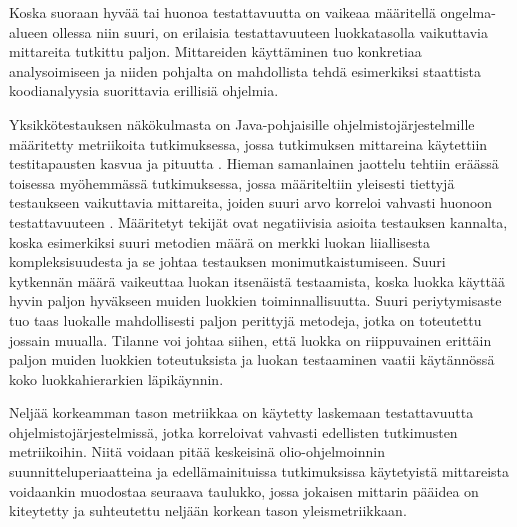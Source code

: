 \documentclass[finnish]{tktltiki2}
\numberwithin{table}{section}
\theoremstyle{definition}
\theoremstyle{remark}
\begin{document}
Koska suoraan hyvää tai huonoa testattavuutta on vaikeaa määritellä ongelma-alueen ollessa niin suuri, on erilaisia testattavuuteen luokkatasolla vaikuttavia mittareita tutkittu paljon. Mittareiden käyttäminen tuo konkretiaa analysoimiseen ja niiden pohjalta on mahdollista tehdä esimerkiksi staattista koodianalyysia suorittavia erillisiä ohjelmia. 

Yksikkötestauksen näkökulmasta on Java-pohjaisille ohjelmistojärjestelmille määritetty metriikoita tutkimuksessa, jossa tutkimuksen mittareina käytettiin testitapausten kasvua ja pituutta \citep{Bruntink:2004}. Hieman samanlainen jaottelu tehtiin eräässä toisessa myöhemmässä tutkimuksessa, jossa määriteltiin yleisesti tiettyjä testaukseen vaikuttavia mittareita, joiden suuri arvo korreloi vahvasti huonoon testattavuuteen \citep{Dubey:2011:AMM:2020976.2020983}. Määritetyt tekijät ovat negatiivisia asioita testauksen kannalta, koska esimerkiksi suuri metodien määrä on merkki luokan liiallisesta kompleksisuudesta ja se johtaa testauksen monimutkaistumiseen. Suuri kytkennän määrä vaikeuttaa luokan itsenäistä testaamista, koska luokka käyttää hyvin paljon hyväkseen muiden luokkien toiminnallisuutta. Suuri periytymisaste tuo taas luokalle mahdollisesti paljon perittyjä metodeja, jotka on toteutettu jossain muualla. Tilanne voi johtaa siihen, että luokka on riippuvainen erittäin paljon muiden luokkien toteutuksista ja luokan testaaminen vaatii käytännössä koko luokkahierarkien läpikäynnin. 

Neljää korkeamman tason metriikkaa on käytetty laskemaan testattavuutta ohjelmistojärjestelmissä, jotka korreloivat vahvasti edellisten tutkimusten metriikoihin. Niitä voidaan pitää keskeisinä olio-ohjelmoinnin suunnitteluperiaatteina \citep{Khan:2009:MBT:1507195.1507204} ja edellämainituissa tutkimuksissa käytetyistä mittareista voidaankin muodostaa seuraava taulukko, jossa jokaisen mittarin pääidea on kiteytetty ja suhteutettu neljään korkean tason yleismetriikkaan.
\end{document}
